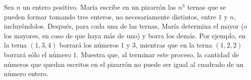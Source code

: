 Sea $n$ un entero positivo. María escribe en un pizarrón las $n^3$ ternas que se pueden formar
tomando tres enteros, no necesariamente distintos, entre $1$ y $n$, incluyéndolos. Después,
para cada una de las ternas, María determina el mayor (o los mayores, en caso de que
haya más de uno) y borra los demás. Por ejemplo, en la terna $(1, 3, 4)$ borrará los números
$1$ y $3$, mientras que en la terna $(1, 2, 2)$ borrará sólo el número $1$.
Muestra que, al terminar este proceso, la cantidad de números que quedan escritos en el
pizarrón no puede ser igual al cuadrado de un número entero.